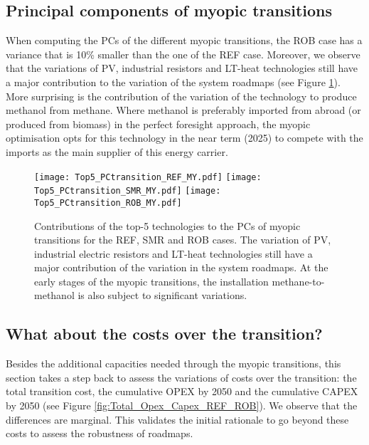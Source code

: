 \subsection{Principal components of myopic transitions}
\label{subsec:RobPol:PC_MY_transition}
When computing the \gls{PCs} of the different myopic transitions, the ROB case has a variance that is 10\% smaller than the one of the REF case. Moreover, we observe that the variations of \gls{PV}, industrial resistors and \gls{LT}-heat technologies still have a major contribution to the variation of the system roadmaps (see Figure \ref{fig:Top5_PCtransition_cases}). More surprising is the contribution of the variation of the technology to produce methanol from methane. Where methanol is preferably imported from abroad (or produced from biomass) in the perfect foresight approach, the myopic optimisation opts for this technology in the near term (2025) to compete with the imports as the main supplier of this energy carrier.

\begin{figure}[!htbp]
\centering
\texttt{[image: Top5\_PCtransition\_REF\_MY.pdf]}
\texttt{[image: Top5\_PCtransition\_SMR\_MY.pdf]}
\texttt{[image: Top5\_PCtransition\_ROB\_MY.pdf]}
\caption{Contributions of the top-5 technologies to the \gls{PCs} of myopic transitions for the REF, SMR and ROB cases. The variation of \gls{PV}, industrial electric resistors and \gls{LT}-heat technologies still have a major contribution of the variation in the system roadmaps. At the early stages of the myopic transitions, the installation methane-to-methanol is also subject to significant variations.}
\label{fig:Top5_PCtransition_cases}
\end{figure}

\newpage
\subsection{What about the costs over the transition?}
\label{subsec:RobPol:costs_comparison}
Besides the additional capacities needed through the myopic transitions, this section takes a step back to assess the variations of costs over the transition: the total transition cost, the cumulative \gls{OPEX} by 2050 and the cumulative \gls{CAPEX} by 2050 (see Figure \ref{fig:Total_Opex_Capex_REF_ROB}). We observe that the differences are marginal. This validates the initial rationale to go beyond these costs to assess the robustness of roadmaps.

